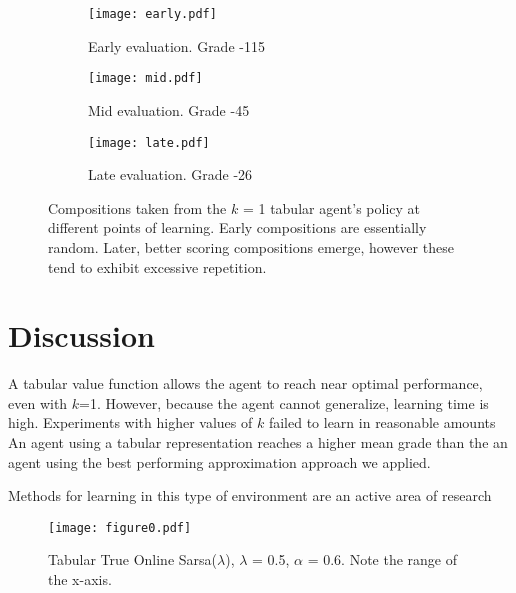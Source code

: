 \documentclass{article}
\begin{document}
    \begin{figure*}
    \begin{subfigure}{\linewidth}
        \texttt{[image: early.pdf]}
        \caption{Early evaluation. Grade -115}
    \end{subfigure}
    
    \begin{subfigure}{\linewidth}
        \texttt{[image: mid.pdf]}
        \caption{Mid evaluation. Grade -45}
    \end{subfigure}
    
    \begin{subfigure}{\linewidth}
        \texttt{[image: late.pdf]}
        \caption{Late evaluation. Grade -26}
    \end{subfigure}
    \caption{Compositions taken from the $k$ = 1 tabular agent's policy at different points of learning. Early compositions are essentially random. Later, better scoring compositions emerge, however these tend to exhibit excessive repetition.\protect\footnotemark}

    \end{figure*}

	\section{Discussion}
    
    A tabular value function allows the agent to reach near optimal performance, even with $k$=1. However, because the agent cannot generalize, learning time is high. Experiments with higher values of $k$ failed to learn in reasonable amounts An agent using a tabular representation reaches a higher mean grade than the an agent using the best performing approximation approach we applied.
    
	Methods for learning in this type of environment are an active area of research \cite{Hausknecht2015}
	\begin{figure}
		\texttt{[image: figure0.pdf]}
        \caption{Tabular True Online Sarsa($\lambda$), $\lambda$ = 0.5, $\alpha$ = 0.6. Note the range of the x-axis.}
	\end{figure}
    
\end{document}
